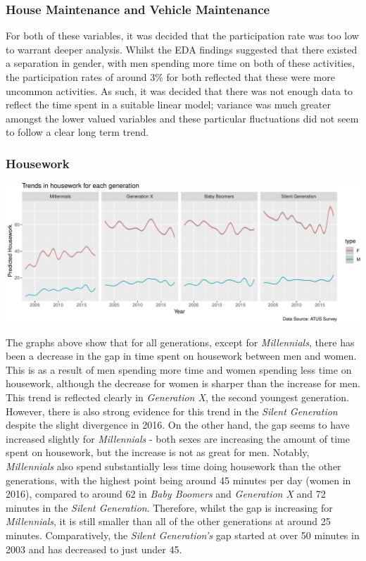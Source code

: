 \documentclass[11pt,]{article}
\begin{document}
\hypertarget{house-maintenance-and-vehicle-maintenance}{%
\subsubsection{House Maintenance and Vehicle
Maintenance}\label{house-maintenance-and-vehicle-maintenance}}

For both of these variables, it was decided that the participation rate
was too low to warrant deeper analysis. Whilst the EDA findings
suggested that there existed a separation in gender, with men spending
more time on both of these activities, the participation rates of around
3\% for both reflected that these were more uncommon activities. As
such, it was decided that there was not enough data to reflect the time
spent in a suitable linear model; variance was much greater amongst the
lower valued variables and these particular fluctuations did not seem to
follow a clear long term trend.

\hypertarget{housework}{%
\subsubsection{Housework}\label{housework}}

\includegraphics{Final-Report_files/figure-latex/unnamed-chunk-5-1}

The graphs above show that for all generations, except for
\emph{Millennials}, there has been a decrease in the gap in time spent
on housework between men and women. This is as a result of men spending
more time and women spending less time on housework, although the
decrease for women is sharper than the increase for men. This trend is
reflected clearly in \emph{Generation X}, the second youngest
generation. However, there is also strong evidence for this trend in the
\emph{Silent Generation} despite the slight divergence in 2016. On the
other hand, the gap seems to have increased slightly for
\emph{Millennials} - both sexes are increasing the amount of time spent
on housework, but the increase is not as great for men. Notably,
\emph{Millennials} also spend substantially less time doing housework
than the other generations, with the highest point being around 45
minutes per day (women in 2016), compared to around 62 in \emph{Baby
Boomers} and \emph{Generation X} and 72 minutes in the \emph{Silent
Generation}. Therefore, whilst the gap is increasing for
\emph{Millennials}, it is still smaller than all of the other
generations at around 25 minutes. Comparatively, the \emph{Silent
Generation's} gap started at over 50 minutes in 2003 and has decreased
to just under 45.
\end{document}
